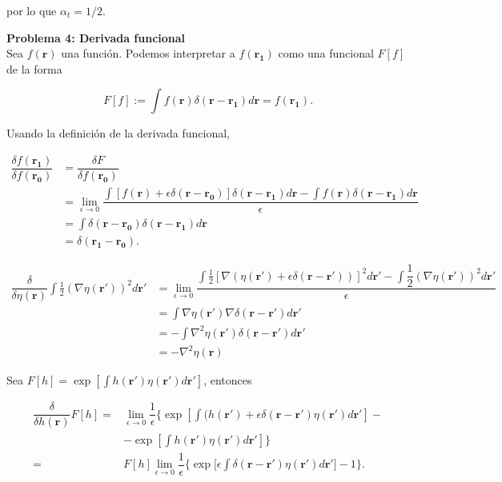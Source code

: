 \documentclass[10pt]{article}
\begin{document}
por lo que $\alpha_t = 1/2$.

\pagebreak

\textbf{Problema 4: Derivada funcional}\\

Sea $f(\mathbf{r})$ una funci\'on. Podemos interpretar a $f(\mathbf{r_1})$ como una funcional $F[f]$ de la forma

\begin{equation}
F[f] := \int f(\mathbf{r}) \delta(\mathbf{r} - \mathbf{r_1}) d \mathbf{r} = f(\mathbf{r_1}).
\end{equation}

Usando la definici\'on de la derivada funcional,

\begin{align*}
\dfrac{\delta f(\mathbf{r_1})}{\delta f(\mathbf{r_0})} &= \dfrac{\delta F}{\delta f(\mathbf{r_0})} \\
&= \lim_{\epsilon\rightarrow 0} \dfrac{\int \left[ f(\mathbf{r}) + \epsilon \delta(\mathbf{r} - \mathbf{r_0})\right] \delta(\mathbf{r} - \mathbf{r_1}) d \mathbf{r} - \int f(\mathbf{r}) \delta(\mathbf{r} - \mathbf{r_1}) d \mathbf{r}}{\epsilon} \\
&= \int \delta(\mathbf{r} - \mathbf{r_0}) \delta(\mathbf{r} - \mathbf{r_1}) d \mathbf{r} \\
&=  \delta(\mathbf{r_1} - \mathbf{r_0}).
\end{align*}

\begin{align*}
\dfrac{\delta}{\delta \eta(\mathbf{r})}\int \frac{1}{2} \left(\nabla \eta(\mathbf{r'})\right)^2 d\mathbf{r'} &= \lim_{\epsilon \rightarrow 0} \dfrac{ \int \frac{1}{2} \left[\nabla \left(\eta(\mathbf{r'}) + \epsilon \delta(\mathbf{r}-\mathbf{r'})\right)\right]^2 d\mathbf{r'} - \int \dfrac{1}{2} \left(\nabla \eta(\mathbf{r'})\right)^2 d\mathbf{r'} }{\epsilon} \\
&=   \int \nabla \eta(\mathbf{r'})\nabla  \delta(\mathbf{r}-\mathbf{r'}) d\mathbf{r'} \\
&= - \int \nabla^2 \eta(\mathbf{r'}) \delta(\mathbf{r}-\mathbf{r'}) d\mathbf{r'} \\
&= -\nabla^2 \eta(\mathbf{r})
\end{align*}

Sea $F[h] = \exp\left[\int h(\mathbf{r'})\eta(\mathbf{r'}) d\mathbf{r'}\right]$, entonces

\begin{align*}
\dfrac{\delta}{\delta h(\mathbf{r})} F[h] =& \lim_{\epsilon\rightarrow 0} \dfrac{1}{\epsilon}\bigg\lbrace 
\exp\left[\int (h(\mathbf{r'}) + \epsilon \delta(\mathbf{r}-\mathbf{r'}) \eta(\mathbf{r'}) d\mathbf{r'}\right] - \\
&-\exp\left[\int h(\mathbf{r'})\eta(\mathbf{r'}) d\mathbf{r'}\right] \bigg\rbrace \\
=& F[h] \lim_{\epsilon\rightarrow 0} \dfrac{1}{\epsilon}  \bigg\lbrace \exp\bigg[\epsilon \int \delta(\mathbf{r} - \mathbf{r'})\eta(\mathbf{r'}) d\mathbf{r'}\bigg] -1 \bigg\rbrace.
\end{align*}
\end{document}
